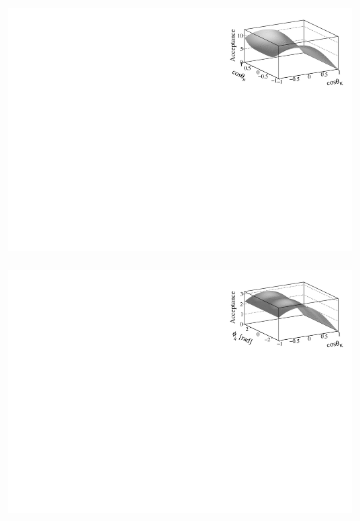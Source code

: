 \begin{figure}[h]
  \centering
  \begin{subfigure}{0.5\textwidth}
    \includegraphics[width=\textwidth]{Figures/Chapter4/canv_cosThK_cosThL_Sim08_3fb_hel_negKaons_all.pdf}
    \caption{}
    \label{eff2D_kl}
  \end{subfigure}%
  \hfill%
  \begin{subfigure}{0.5\textwidth}
    \includegraphics[width=\textwidth]{Figures/Chapter4/canv_cosThK_phi_Sim08_3fb_hel_negKaons_all.pdf}
    \caption{}
    \label{eff2D_kp}
  \end{subfigure}
  \begin{subfigure}{0.5\textwidth}

\end{subfigure}
\end{figure}
